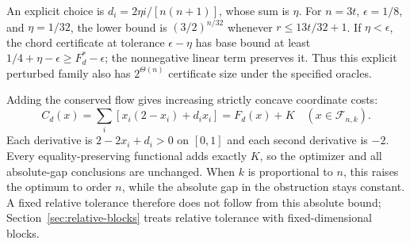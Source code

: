 An explicit choice is $d_i=2\eta i/[n(n+1)]$, whose sum is $\eta$.
For $n=3t$, $\epsilon=1/8$, and $\eta=1/32$, the lower bound is
$(3/2)^{n/32}$ whenever $r\le13t/32+1$.
If $\eta<\epsilon$, the chord certificate at tolerance
$\epsilon-\eta$ has base bound at least
$1/4+\eta-\epsilon\ge F_d^*-\epsilon$; the nonnegative linear term
preserves it. Thus this explicit perturbed family also has
$2^{\Theta(n)}$ certificate size under the specified oracles.

Adding the conserved flow gives increasing strictly concave coordinate
costs:
\begin{equation}\label{eq:increasing-allocation}
 C_d(x)=\sum_i[x_i(2-x_i)+d_ix_i]=F_d(x)+K
 \quad(x\in\mathcal F_{n,k}).
\end{equation}
Each derivative is $2-2x_i+d_i>0$ on $[0,1]$ and each second derivative
is $-2$. Every equality-preserving functional adds exactly $K$, so the
optimizer and all absolute-gap conclusions are unchanged. When $k$ is
proportional to $n$, this raises the optimum to order $n$, while the
absolute gap in the obstruction stays constant. A fixed relative tolerance
therefore does not follow from this absolute bound;
Section~\ref{sec:relative-blocks} treats relative tolerance with
fixed-dimensional blocks.
